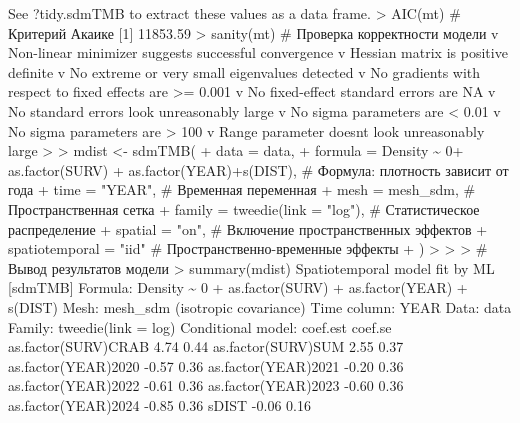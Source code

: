 \documentclass[
  letterpaper,
  DIV=11,
  numbers=noendperiod]{scrreprt}
\newenvironment{Shaded}{\begin{snugshade}}{\end{snugshade}}
\newcommand{\CommentTok}[1]{\textcolor[rgb]{0.37,0.37,0.37}{#1}}
\newcommand{\ConstantTok}[1]{\textcolor[rgb]{0.56,0.35,0.01}{#1}}
\newcommand{\DecValTok}[1]{\textcolor[rgb]{0.68,0.00,0.00}{#1}}
\newcommand{\FloatTok}[1]{\textcolor[rgb]{0.68,0.00,0.00}{#1}}
\newcommand{\FunctionTok}[1]{\textcolor[rgb]{0.28,0.35,0.67}{#1}}
\newcommand{\NormalTok}[1]{\textcolor[rgb]{0.00,0.23,0.31}{#1}}
\newcommand{\SpecialCharTok}[1]{\textcolor[rgb]{0.37,0.37,0.37}{#1}}
\newcommand{\StringTok}[1]{\textcolor[rgb]{0.13,0.47,0.30}{#1}}
\begin{document}
\begin{Shaded}
\begin{Highlighting}[]
\NormalTok{See ?tidy.sdmTMB to extract these values as a data frame.}
\SpecialCharTok{\textgreater{}} \FunctionTok{AIC}\NormalTok{(mt)  }\CommentTok{\# Критерий Акаике}
\NormalTok{[}\DecValTok{1}\NormalTok{] }\FloatTok{11853.59}
\SpecialCharTok{\textgreater{}} \FunctionTok{sanity}\NormalTok{(mt)  }\CommentTok{\# Проверка корректности модели}
\NormalTok{v Non}\SpecialCharTok{{-}}\NormalTok{linear minimizer suggests successful convergence}
\NormalTok{v Hessian matrix is positive definite}
\NormalTok{v No extreme or very small eigenvalues detected}
\NormalTok{v No gradients with respect to fixed effects are }\SpecialCharTok{\textgreater{}=} \FloatTok{0.001}
\NormalTok{v No fixed}\SpecialCharTok{{-}}\NormalTok{effect standard errors are }\ConstantTok{NA}
\NormalTok{v No standard errors look unreasonably large}
\NormalTok{v No sigma parameters are }\SpecialCharTok{\textless{}} \FloatTok{0.01}
\NormalTok{v No sigma parameters are }\SpecialCharTok{\textgreater{}} \DecValTok{100}
\NormalTok{v Range parameter doesn}\StringTok{\textquotesingle{}t look unreasonably large}
\StringTok{\textgreater{} }
\StringTok{\textgreater{} mdist \textless{}{-} sdmTMB(}
\StringTok{+   data = data, }
\StringTok{+   formula = Density \textasciitilde{} 0+ as.factor(SURV) + as.factor(YEAR)+s(DIST),  \# Формула: плотность зависит от года}
\StringTok{+   time = "YEAR",         \# Временная переменная}
\StringTok{+   mesh = mesh\_sdm,       \# Пространственная сетка}
\StringTok{+   family = tweedie(link = "log"),  \# Статистическое распределение}
\StringTok{+   spatial = "on",        \# Включение пространственных эффектов}
\StringTok{+   spatiotemporal = "iid" \# Пространственно{-}временные эффекты}
\StringTok{+ )}
\StringTok{\textgreater{} }
\StringTok{\textgreater{} }
\StringTok{\textgreater{} \# Вывод результатов модели}
\StringTok{\textgreater{} summary(mdist)}
\StringTok{Spatiotemporal model fit by ML [\textquotesingle{}}\NormalTok{sdmTMB}\StringTok{\textquotesingle{}]}
\StringTok{Formula: Density \textasciitilde{} 0 + as.factor(SURV) + as.factor(YEAR) + s(DIST)}
\StringTok{Mesh: mesh\_sdm (isotropic covariance)}
\StringTok{Time column: YEAR}
\StringTok{Data: data}
\StringTok{Family: tweedie(link = \textquotesingle{}}\NormalTok{log}\StringTok{\textquotesingle{})}
\StringTok{ }
\StringTok{Conditional model:}
\StringTok{                    coef.est coef.se}
\StringTok{as.factor(SURV)CRAB     4.74    0.44}
\StringTok{as.factor(SURV)SUM      2.55    0.37}
\StringTok{as.factor(YEAR)2020    {-}0.57    0.36}
\StringTok{as.factor(YEAR)2021    {-}0.20    0.36}
\StringTok{as.factor(YEAR)2022    {-}0.61    0.36}
\StringTok{as.factor(YEAR)2023    {-}0.60    0.36}
\StringTok{as.factor(YEAR)2024    {-}0.85    0.36}
\StringTok{sDIST                  {-}0.06    0.16}


\end{Highlighting}
\end{Shaded}
\end{document}
